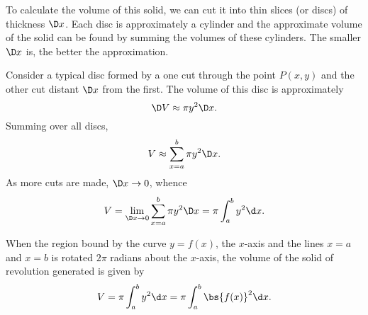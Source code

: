 \begin{figure}[H]
    \centering
    \caption{}
\end{figure}

To calculate the volume of this solid, we can cut it into thin slices (or discs) of thickness $\D x$. Each disc is approximately a cylinder and the approximate volume of the solid can be found by summing the volumes of these cylinders. The smaller $\D x$ is, the better the approximation.

Consider a typical disc formed by a one cut through the point $P(x, y)$ and the other cut distant $\D x$ from the first. The volume of this disc is approximately \[\D V \approx \pi y^2 \D x.\] Summing over all discs, \[V \approx \sum_{x = a}^{b} \pi y^2 \D x.\] As more cuts are made, $\D x \to 0$, whence \[V = \lim_{\D x \to 0} \sum_{x = a}^{b} \pi y^2 \D x = \pi \int_a^b y^2 \d x.\]

\begin{proposition}
    When the region bound by the curve $y = f(x)$, the $x$-axis and the lines $x = a$ and $x = b$ is rotated $2\pi$ radians about the $x$-axis, the volume of the solid of revolution generated is given by \[V = \pi \int_a^b y^2 \d x = \pi \int_a^b \bs{f(x)}^2 \d x.\]
\end{proposition}

